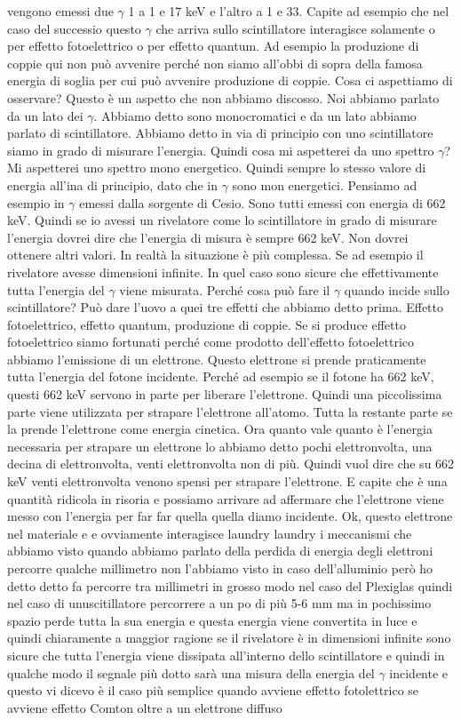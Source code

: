 {vengono emessi due $\gamma$ 1 a 1 e 17 keV e l'altro a 1 e 33. Capite ad esempio che nel caso del successio questo $\gamma$ che arriva sullo scintillatore interagisce solamente o per effetto fotoelettrico o per effetto quantum. Ad esempio la produzione di coppie qui non può avvenire perché non siamo all'obbi di sopra della famosa energia di soglia per cui può avvenire produzione di coppie. Cosa ci aspettiamo di osservare? Questo è un aspetto che non abbiamo discosso. Noi abbiamo parlato da un lato dei $\gamma$. Abbiamo detto sono monocromatici e da un lato abbiamo parlato di scintillatore. Abbiamo detto in via di principio con uno scintillatore siamo in grado di misurare l'energia. Quindi cosa mi aspetterei da uno spettro $\gamma$? Mi aspetterei uno spettro mono energetico. Quindi sempre lo stesso valore di energia all'ina di principio, dato che in $\gamma$ sono mon energetici. Pensiamo ad esempio in $\gamma$ emessi dalla sorgente di Cesio. Sono tutti emessi con energia di 662 keV. Quindi se io avessi un rivelatore come lo scintillatore in grado di misurare l'energia dovrei dire che l'energia di misura è sempre 662 keV. Non dovrei ottenere altri valori. In realtà la situazione è più complessa. Se ad esempio il rivelatore avesse dimensioni infinite. In quel caso sono sicure che effettivamente tutta l'energia del $\gamma$ viene misurata. Perché cosa può fare il $\gamma$ quando incide sullo scintillatore? Può dare l'uovo a quei tre effetti che abbiamo detto prima. Effetto fotoelettrico, effetto quantum, produzione di coppie. Se si produce effetto fotoelettrico siamo fortunati perché come prodotto dell'effetto fotoelettrico abbiamo l'emissione di un elettrone. Questo elettrone si prende praticamente tutta l'energia del fotone incidente. Perché ad esempio se il fotone ha 662 keV, questi 662 keV servono in parte per liberare l'elettrone. Quindi una piccolissima parte viene utilizzata per strapare l'elettrone all'atomo. Tutta la restante parte se la prende l'elettrone come energia cinetica. Ora quanto vale quanto è l'energia necessaria per strapare un elettrone lo abbiamo detto pochi elettronvolta, una decina di elettronvolta, venti elettronvolta non di più. Quindi vuol dire che su 662 keV venti elettronvolta venono spensi per strapare l'elettrone. E capite che è una quantità ridicola in risoria e possiamo arrivare ad affermare che l'elettrone viene messo con l'energia per far far quella quella diamo incidente. Ok, questo elettrone nel materiale e e ovviamente interagisce laundry laundry i meccanismi che abbiamo visto quando abbiamo parlato della perdida di energia degli elettroni percorre qualche millimetro non l'abbiamo visto in caso dell'alluminio però ho detto detto fa percorre tra millimetri in grosso modo nel caso del Plexiglas quindi nel caso di unuscitillatore percorrere a un po di più 5-6 mm ma in pochissimo spazio perde tutta la sua energia e questa energia viene convertita in luce e quindi chiaramente a maggior ragione se il rivelatore è in dimensioni infinite sono sicure che tutta l'energia viene dissipata all'interno dello scintillatore e quindi in qualche modo il segnale più dotto sarà una misura della energia del $\gamma$ incidente e questo vi dicevo è il caso più semplice quando avviene effetto fotolettrico se avviene effetto Comton oltre a un elettrone diffuso }
